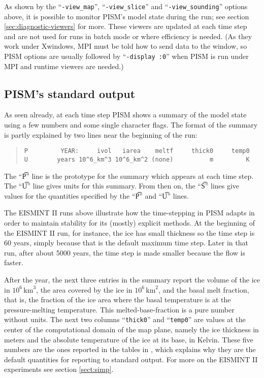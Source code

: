 As shown by the ``\verb|-view_map|'', ``\verb|-view_slice|'' and ``\verb|-view_sounding|'' options above, it is possible to monitor PISM's model state during the run; see section \ref{sec:diagnostic-viewers} for more. These viewers are updated at each time step and are not used for runs in batch mode or where efficiency is needed.  (As they work under Xwindows, MPI must be told how to send data to the window, so PISM options are usually followed by ``\verb|-display :0|'' when PISM is run under MPI and runtime viewers are needed.)


\subsection{PISM's standard output}   As seen already, at each time step PISM shows a summary of the model state using a few numbers and some single character flags.  The format of the summary is partly explained by two lines near the beginning of the run:

\small\begin{quote}
\begin{verbatim}
P         YEAR:     ivol   iarea    meltf     thick0     temp0
U        years 10^6_km^3 10^6_km^2 (none)          m         K
\end{verbatim}
\end{quote}\normalsize

The ``\t{P}'' line is the prototype for the summary which appears at each time step.  The ``\t{U}'' line gives units for this summary.  From then on, the ``\t{S}'' lines give values for the quantities specified by the  ``\t{P}'' and ``\t{U}'' lines.

The EISMINT II runs above illustrate how the time-stepping in PISM adapts in order to maintain stability for its (mostly) explicit methods.  At the beginning of the EISMINT II run, for instance, the ice has small thickness so the time step is 60 years, simply because that is the default maximum time step.  Later in that run, after about 5000 years, the time step is made smaller because the flow is faster.

After the year, the next three entries in the summary report the volume of the ice in $10^6 \,\text{km}^3$, the area covered by the ice in $10^6\,\text{km}^2$, and the basal melt fraction, that is, the fraction of the ice area where the basal temperature is at the pressure-melting temperature.  This melted-base-fraction is a pure number without units.  The next two columns ``\texttt{thick0}'' and ``\texttt{temp0}'' are values at the center of the computational domain of the map plane, namely the ice thickness in meters and the absolute temperature of the ice at its base, in Kelvin.  These five numbers are the ones reported in the tables in \cite{EISMINT00}, which explains why they are the default quantities for reporting to standard output.  For more on the EISMINT II experiments see section \ref{sect:simp}.

